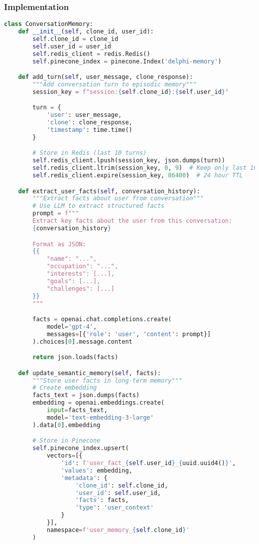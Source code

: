 \documentclass[10pt]{article}
\begin{document}
\subsubsection{Implementation}

\begin{lstlisting}[language=Python]
class ConversationMemory:
    def __init__(self, clone_id, user_id):
        self.clone_id = clone_id
        self.user_id = user_id
        self.redis_client = redis.Redis()
        self.pinecone_index = pinecone.Index('delphi-memory')

    def add_turn(self, user_message, clone_response):
        """Add conversation turn to episodic memory"""
        session_key = f"session:{self.clone_id}:{self.user_id}"

        turn = {
            'user': user_message,
            'clone': clone_response,
            'timestamp': time.time()
        }

        # Store in Redis (last 10 turns)
        self.redis_client.lpush(session_key, json.dumps(turn))
        self.redis_client.ltrim(session_key, 0, 9)  # Keep only last 10
        self.redis_client.expire(session_key, 86400)  # 24 hour TTL

    def extract_user_facts(self, conversation_history):
        """Extract facts about user from conversation"""
        # Use LLM to extract structured facts
        prompt = f"""
        Extract key facts about the user from this conversation:
        {conversation_history}

        Format as JSON:
        {{
            "name": "...",
            "occupation": "...",
            "interests": [...],
            "goals": [...],
            "challenges": [...]
        }}
        """

        facts = openai.chat.completions.create(
            model='gpt-4',
            messages=[{'role': 'user', 'content': prompt}]
        ).choices[0].message.content

        return json.loads(facts)

    def update_semantic_memory(self, facts):
        """Store user facts in long-term memory"""
        # Create embedding
        facts_text = json.dumps(facts)
        embedding = openai.embeddings.create(
            input=facts_text,
            model='text-embedding-3-large'
        ).data[0].embedding

        # Store in Pinecone
        self.pinecone_index.upsert(
            vectors=[{
                'id': f'user_fact_{self.user_id}_{uuid.uuid4()}',
                'values': embedding,
                'metadata': {
                    'clone_id': self.clone_id,
                    'user_id': self.user_id,
                    'facts': facts,
                    'type': 'user_context'
                }
            }],
            namespace=f'user_memory_{self.clone_id}'
        )


\end{lstlisting}
\end{document}
